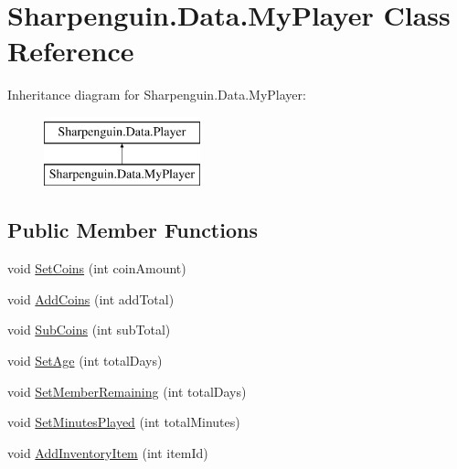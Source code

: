 \hypertarget{classSharpenguin_1_1Data_1_1MyPlayer}{\section{\-Sharpenguin.\-Data.\-My\-Player \-Class \-Reference}
\label{classSharpenguin_1_1Data_1_1MyPlayer}
}
\-Inheritance diagram for \-Sharpenguin.\-Data.\-My\-Player\-:\begin{figure}[H]
\begin{center}
\leavevmode
\includegraphics[height=2.000000cm]{classSharpenguin_1_1Data_1_1MyPlayer}
\end{center}
\end{figure}
\subsection*{\-Public \-Member \-Functions}
\begin{DoxyCompactItemize}
\item 
void \hyperlink{classSharpenguin_1_1Data_1_1MyPlayer_a7c6ae02df5a0ae641334476ec006a8e6}{\-Set\-Coins} (int coin\-Amount)
\item 
void \hyperlink{classSharpenguin_1_1Data_1_1MyPlayer_aeb44bb50999e60840b40332f2d0dc46b}{\-Add\-Coins} (int add\-Total)
\item 
void \hyperlink{classSharpenguin_1_1Data_1_1MyPlayer_a0fd8844c00e98e02bd7a189b04f248d2}{\-Sub\-Coins} (int sub\-Total)
\item 
void \hyperlink{classSharpenguin_1_1Data_1_1MyPlayer_a4896f30067506d8fa77f61293bed7444}{\-Set\-Age} (int total\-Days)
\item 
void \hyperlink{classSharpenguin_1_1Data_1_1MyPlayer_a84c976af85d5fb48f8137e6f047c823b}{\-Set\-Member\-Remaining} (int total\-Days)
\item 
void \hyperlink{classSharpenguin_1_1Data_1_1MyPlayer_a9e96ff952268372d8b43cbde269b58d5}{\-Set\-Minutes\-Played} (int total\-Minutes)
\item 
void \hyperlink{classSharpenguin_1_1Data_1_1MyPlayer_ad9bf7d1039275986d48cb2c0c11144ac}{\-Add\-Inventory\-Item} (int item\-Id)
\end{DoxyCompactItemize}
